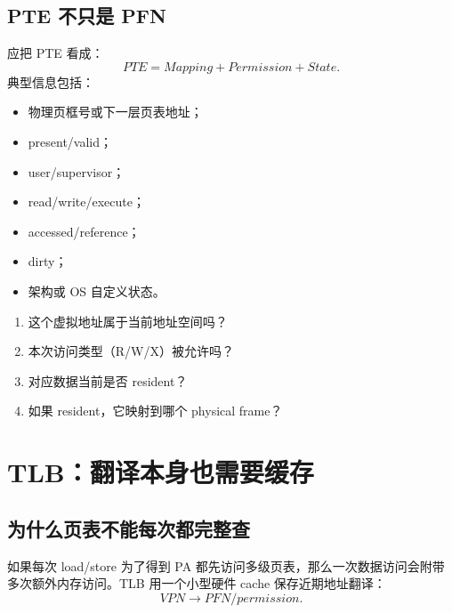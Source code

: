 \documentclass[11pt,a4paper]{ctexart}
\begin{document}
\subsection{PTE 不只是 PFN}
应把 PTE 看成：
\[
\boxed{PTE=Mapping+Permission+State}.
\]
典型信息包括：
\begin{itemize}
  \item 物理页框号或下一层页表地址；
  \item present/valid；
  \item user/supervisor；
  \item read/write/execute；
  \item accessed/reference；
  \item dirty；
  \item 架构或 OS 自定义状态。
\end{itemize}

\begin{exam}[一条访存真正提出的四个问题]
\begin{enumerate}
  \item 这个虚拟地址属于当前地址空间吗？
  \item 本次访问类型（R/W/X）被允许吗？
  \item 对应数据当前是否 resident？
  \item 如果 resident，它映射到哪个 physical frame？
\end{enumerate}
\end{exam}

\section{TLB：翻译本身也需要缓存}

\subsection{为什么页表不能每次都完整查}
如果每次 load/store 为了得到 PA 都先访问多级页表，那么一次数据访问会附带多次额外内存访问。TLB 用一个小型硬件 cache 保存近期地址翻译：
\[
VPN\to PFN/permission.
\]
\end{document}
